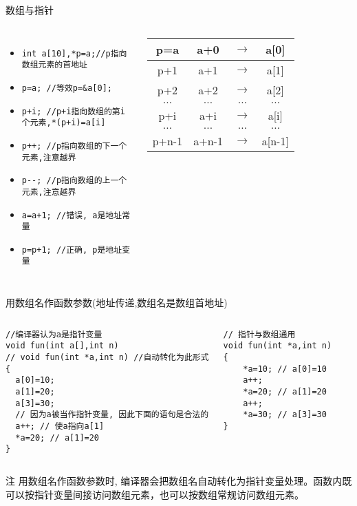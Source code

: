\begin{frame}{数组与指针}
\begin{columns}[T]
\begin{itemize}
	\item \lstinline|int a[10],*p=a;//p指向数组元素的首地址|
	\item \lstinline|p=a; //等效p=&a[0];|
	\item \lstinline|p+i; //p+i指向数组的第i个元素,*(p+i)=a[i]|
	\item \lstinline|p++; //p指向数组的下一个元素,注意越界|
	\item \lstinline|p--; //p指向数组的上一个元素,注意越界|
	\item \lstinline|a=a+1; //错误, a是地址常量|
	\item \lstinline|p=p+1; //正确, p是地址变量|
\end{itemize}
\begin{tabular}{|c|cc|c|}
	\hline 
	p=a & a+0 &$\to$ & a[0]\\
	\hline 
	p+1 & a+1 &$\to$ & a[1]\\
	\hline 
	p+2 & a+2 &$\to$ & a[2]\\
	\hline 
	$\dots$   & $\dots$ & $\dots$ & $\dots$ \\
	\hline 
	p+i & a+i &$\to$ & a[i]\\
	\hline 
	$\dots$ & $\dots$ & $\dots$ & $\dots$ \\
	\hline 
	p+n-1 & a+n-1 &$\to$ & a[n-1]\\
	\hline 
\end{tabular}
\end{columns}
\end{frame}

\begin{frame}{用数组名作函数参数(地址传递,数组名是数组首地址)}
\begin{columns}[T]
\begin{lstlisting}
//编译器认为a是指针变量
void fun(int a[],int n)
// void fun(int *a,int n) //自动转化为此形式
{
  a[0]=10;
  a[1]=20;
  a[3]=30;
  // 因为a被当作指针变量, 因此下面的语句是合法的
  a++; // 使a指向a[1]
  *a=20; // a[1]=20
}
\end{lstlisting}
\begin{lstlisting}
// 指针与数组通用
void fun(int *a,int n)
{
    *a=10; // a[0]=10
    a++;
    *a=20; // a[1]=20
    a++;
    *a=30; // a[3]=30
}
\end{lstlisting}
\end{columns}
\begin{block}{注}
	\small
	用数组名作函数参数时, 编译器会把数组名自动转化为指针变量处理。函数内既可以按指针变量间接访问数组元素，也可以按数组常规访问数组元素。
\end{block}
\end{frame}

